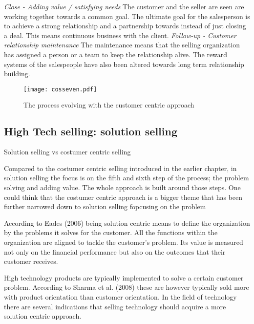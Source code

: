 \documentclass[12pt,a4paper,oneside,pdftex]{report}
\begin{document}
\emph{Close - Adding value / satisfying needs}\newline
The customer and the seller are seen are working together towards a common goal. The ultimate goal for the salesperson is to achieve a strong relationship and a partnership towards instead of just closing a deal. This means continuous business with the client. \citep{Moncrief} \newline \newline
\emph{Follow-up - Customer relationship maintenance}\newline
The maintenance means that the selling organization has assigned a person or a team to keep the relationship alive. The reward systems of the salespeople have also been altered towards long term relationship building.  \citep{Moncrief}
\begin{figure}[ht]
  \begin{center}
    \texttt{[image: cosseven.pdf]}
    \caption{The process evolving with the customer centric approach}
    \label{fig:cosseven}
  \end{center}
\end{figure}

\subsection{High Tech selling: solution selling}

Solution selling vs costumer centric selling

Compared to the costumer centric selling introduced in the earlier chapter, in solution selling  the focus is on the fifth and sixth step of the process; the problem solving and adding value. The whole approach is built around those steps. One could think that the costumer centric approach is a bigger theme that has been further narrowed down to solution selling fopcusing on the problem

According to Eades (2006) being solution centric means to define the organization by the problems it solves for the customer. All the functions within the organization are aligned to tackle the customer's problem. Its value is measured not only on the financial performance but also on the outcomes that their customer receives. 

High technology products are typically implemented to solve a certain customer problem. According to Sharma et al. (2008) these are however typically sold more with product orientation than  customer orientation. In the field of technology there are several indications that selling technology should acquire a more solution centric approach.
\end{document}
